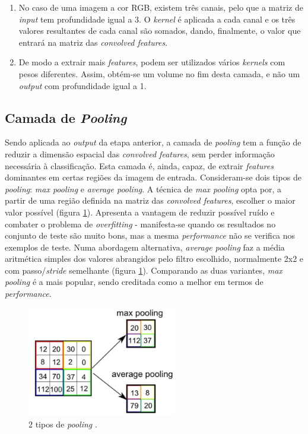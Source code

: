 \begin{enumerate}
        \item No caso de uma imagem a cor RGB, existem três canais, pelo que a matriz de \textit{input} tem profundidade igual a 3. O \textit{kernel} é aplicada a cada canal e os três valores resultantes de cada canal são somados, dando, finalmente, o valor que entrará na matriz das \textit{convolved features}.
    \item De modo a extrair mais \textit{features}, podem ser utilizados vários \textit{kernels} com pesos diferentes. Assim, obtém-se um volume no fim desta camada, e não um \textit{output} com profundidade igual a 1.
\end{enumerate}

\subsection{Camada de \textit{Pooling}}
\label{chap2:subsec:pooling}
\noindent Sendo aplicada ao \textit{output} da etapa anterior, a camada de \textit{pooling} tem a função de reduzir a dimensão espacial das \textit{convolved features}, sem perder informação necessária à classificação. Esta camada é, ainda, capaz, de extrair \textit{features} dominantes em certas regiões da imagem de entrada. Consideram-se dois tipos de \textit{pooling}: \textit{max pooling} e \textit{average pooling}.\newline
\noindent A técnica de \textit{max pooling} opta por, a partir de uma região definida na matriz das \textit{convolved features}, escolher o maior valor possível (figura \ref{fig:pooling}). Apresenta a vantagem de reduzir possível ruído e combater o problema de \textit{overfitting} - manifesta-se quando os resultados no conjunto de teste são muito bons, mas a mesma \textit{performance} não se verifica nos exemplos de teste. \newline
\noindent Numa abordagem alternativa, \textit{average pooling} faz a média aritmética simples dos valores abrangidos pelo filtro escolhido, normalmente 2x2 e com passo/\textit{stride} semelhante (figura \ref{fig:pooling}). \newline
\noindent Comparando as duas variantes, \textit{max pooling} é a mais popular, sendo creditada como a melhor em termos de \textit{performance}.

\begin{figure}[h]
\centering
\includegraphics[width=185pt]{pooling.jpg}
\caption{2 tipos de \textit{pooling} \cite{pool}.}
\label{fig:pooling}
\end{figure}

